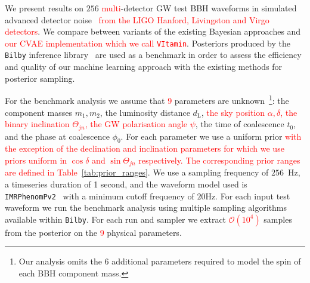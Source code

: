 \documentclass[%
showpacs,
nofootinbib,
 amsmath,amssymb,
 aps,
 twocolumn,
 prl,
 reprint,
floatfix,
]{revtex4-1}
\newcommand{\new}[1]{\textcolor{red}{#1}}
\begin{document}
%
%

%
%
%
%
We present results on $256$ \new{multi}-detector \ac{GW} test \ac{BBH}
waveforms in simulated advanced detector noise~\cite{aligo_noisecurves}
\new{from the LIGO Hanford, Livingston and Virgo detectors}. We compare between
variants of the existing Bayesian approaches and \new{our \ac{CVAE} implementation
which we call \texttt{VItamin}}. Posteriors produced by the \texttt{Bilby}
inference library~\cite{1811.02042} are used as a benchmark in order to assess
the efficiency and quality of our machine learning approach with the existing
methods for posterior sampling.

%
%
For the benchmark analysis we assume that \new{9} parameters are
unknown~\footnote{Our analysis omits the 6 additional parameters required to
model the spin of each \ac{BBH} component mass.}: the component masses $m_1,m_2$, the
luminosity distance $d_{\text{L}}$, \new{the sky position $\alpha,\delta$, the
binary inclination $\Theta_{jn}$, the \ac{GW} polarisation angle ${\psi}$}, the
time of coalescence $t_{0}$, and the phase at coalescence $\phi_0$. For each
parameter we use a uniform prior \new{with the exception of the declination and
inclination parameters for which we use priors uniform in $\cos\delta$ and
$\sin\Theta_{jn}$ respectively. The corresponding prior ranges are defined in
Table~\ref{tab:prior_ranges}}. We use a sampling frequency of $256$~Hz, a
timeseries duration of 1 second, and the waveform model used is
\texttt{IMRPhenomPv2}~\cite{1809.10113} with a minimum cutoff frequency of
$20$Hz. For each input test waveform we run the benchmark analysis using
multiple sampling algorithms available within \texttt{Bilby}. For each run and
sampler we extract \new{$\mathcal{O}(10^4)$} samples from the posterior on the
\new{9} physical parameters.  
\end{document}
